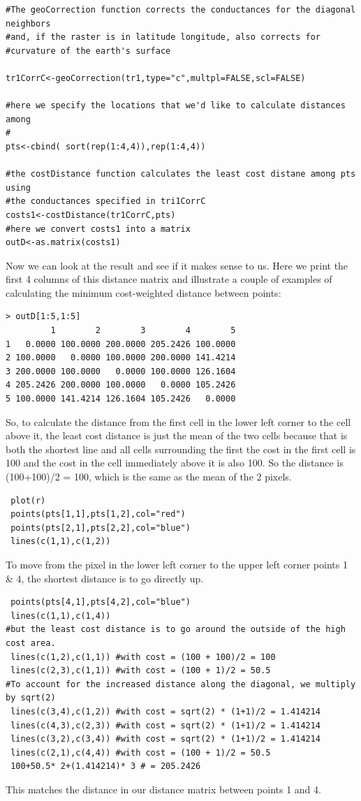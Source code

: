 \documentclass[12pt]{article}
\begin{document}
\begin{spacing}{1.2}
\begin{verbatim}
#The geoCorrection function corrects the conductances for the diagonal neighbors
#and, if the raster is in latitude longitude, also corrects for 
#curvature of the earth's surface

tr1CorrC<-geoCorrection(tr1,type="c",multpl=FALSE,scl=FALSE)

#here we specify the locations that we'd like to calculate distances among
# 
pts<-cbind( sort(rep(1:4,4)),rep(1:4,4))

#the costDistance function calculates the least cost distane among pts using
#the conductances specified in tri1CorrC
costs1<-costDistance(tr1CorrC,pts)
#here we convert costs1 into a matrix
outD<-as.matrix(costs1)
\end{verbatim}



Now we can look at the result and see if it makes sense to us. Here we
print the first 4 columns of this distance matrix and illustrate a
couple of examples of calculating the minimum cost-weighted distance
between points:
\begin{verbatim}
> outD[1:5,1:5]
         1        2        3        4        5
1   0.0000 100.0000 200.0000 205.2426 100.0000
2 100.0000   0.0000 100.0000 200.0000 141.4214
3 200.0000 100.0000   0.0000 100.0000 126.1604
4 205.2426 200.0000 100.0000   0.0000 105.2426
5 100.0000 141.4214 126.1604 105.2426   0.0000
\end{verbatim}

So, to calculate the distance from the first cell in the lower left 
corner to the cell above it, the least cost distance is just the 
mean of the two cells because that is both the shortest line and 
all cells surrounding the first the cost in the first cell is 100 and
the cost in the cell immediately above it is also 100.  So the distance
is (100+100)/2 = 100, which is the same as the mean of the 2 pixels.
\begin{verbatim}
 plot(r)
 points(pts[1,1],pts[1,2],col="red")
 points(pts[2,1],pts[2,2],col="blue")
 lines(c(1,1),c(1,2))
\end{verbatim}
To move from the pixel in the lower left corner to the upper left corner
points 1 \& 4, the shortest distance is to go directly up.
\begin{verbatim}
 points(pts[4,1],pts[4,2],col="blue")
 lines(c(1,1),c(1,4))
#but the least cost distance is to go around the outside of the high cost area.
 lines(c(1,2),c(1,1)) #with cost = (100 + 100)/2 = 100
 lines(c(2,3),c(1,1)) #with cost = (100 + 1)/2 = 50.5
#To account for the increased distance along the diagonal, we multiply by sqrt(2)
 lines(c(3,4),c(1,2)) #with cost = sqrt(2) * (1+1)/2 = 1.414214
 lines(c(4,3),c(2,3)) #with cost = sqrt(2) * (1+1)/2 = 1.414214
 lines(c(3,2),c(3,4)) #with cost = sqrt(2) * (1+1)/2 = 1.414214
 lines(c(2,1),c(4,4)) #with cost = (100 + 1)/2 = 50.5
 100+50.5* 2+(1.414214)* 3 # = 205.2426 
\end{verbatim}
This matches the distance in our distance matrix between points 1 and 4. 





\end{spacing}
\end{document}
